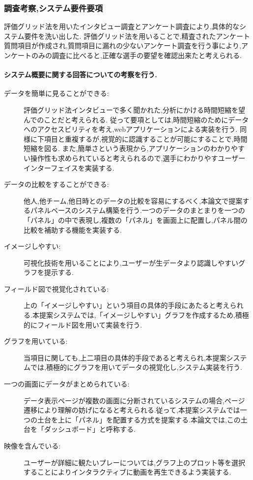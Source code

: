 \documentclass[sotsuron]{kuee}
\begin{document}
			\subsubsection{調査考察,システム要件要項}
				評価グリッド法を用いたインタビュー調査とアンケート調査により,具体的なシステム要件を洗い出した.
				評価グリッド法を用いることで,精査されたアンケート質問項目が作成され,質問項目に漏れの少ないアンケート調査を行う事により,アンケートのみの調査に比べると,正確な選手の要望を確認出来たと考えられる.
					\paragraph {システム概要に関する回答についての考察を行う.}
						\begin{description}
							\item [データを簡単に見ることができる:]
							評価グリッド法インタビューで多く聞かれた,分析にかける時間短縮を望んでのことだと考えられる.
							従って要項としては,時間短縮のためにデータへのアクセスビリティを考え,webアプリケーションによる実装を行う.
							同様に下項目と重複するが,視覚的に認識することが可能にすることで,時間短縮を図る.
							また,簡単さという表現から,アプリケーションのわかりやすい操作性も求められていると考えられるので,選手にわかりやすユーザーインターフェイスを実装する.
							\item [データの比較をすることができる:]
							他人,他チーム,他日時とのデータの比較を容易にするべく,本論文で提案するパネルベースのシステム構築を行う.一つのデータのまとまりを一つの「パネル」の中で表現し,複数の「パネル」を画面上に配置し,パネル間の比較を補助する機能を実装する.
							\item [イメージしやすい:]
							可視化技術を用いることにより,ユーザーが生データより認識しやすいグラフを提示する.
							\item [フィールド図で視覚化されている:]
							上の「イメージしやすい」という項目の具体的手段にあたると考えられる.本提案システムでは,「イメージしやすい」グラフを作成するため,積極的にフィールド図を用いて実装を行う.
							\item [グラフを用いている:]
							当項目に関しても,上二項目の具体的手段であると考えられ,本提案システムでは,積極的にグラフを用いてデータの視覚化し,システム実装を行う.
							\item [一つの画面にデータがまとめられている:]
							データ表示ページが複数の画面に分断されているシステムの場合,ページ遷移により理解の妨げになると考えられる.従って,本提案システムでは一つの土台を上に「パネル」を配置する方式を提案する.本論文では,この土台を「ダッシュボード」と呼称する.
							\item [映像を含んでいる:]
							ユーザーが詳細に観たいプレーについては,グラフ上のプロット等を選択することによりインタラクティブに動画を再生できるよう実装する.
						\end{description}
\end{document}
